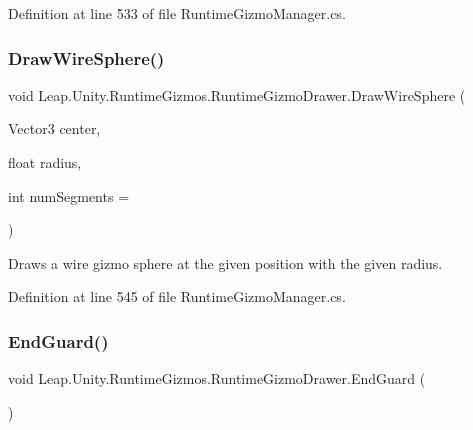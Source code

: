 Definition at line 533 of file Runtime\+Gizmo\+Manager.\+cs.

\mbox{\label{class_leap_1_1_unity_1_1_runtime_gizmos_1_1_runtime_gizmo_drawer_a39a6bcebf95fe56c25c228b2909fe77e}} 
\subsubsection{\texorpdfstring{DrawWireSphere()}{DrawWireSphere()}\hspace{0.1cm}{\footnotesize\ttfamily [2/2]}}
{\footnotesize\ttfamily void Leap.\+Unity.\+Runtime\+Gizmos.\+Runtime\+Gizmo\+Drawer.\+Draw\+Wire\+Sphere (\begin{DoxyParamCaption}\item[{Vector3}]{center,  }\item[{float}]{radius,  }\item[{int}]{num\+Segments = {} }\end{DoxyParamCaption})}



Draws a wire gizmo sphere at the given position with the given radius. 



Definition at line 545 of file Runtime\+Gizmo\+Manager.\+cs.

\mbox{\label{class_leap_1_1_unity_1_1_runtime_gizmos_1_1_runtime_gizmo_drawer_af48e1fd2f99c0ae9f58d0441ce35028b}} 
\subsubsection{\texorpdfstring{EndGuard()}{EndGuard()}}
{\footnotesize\ttfamily void Leap.\+Unity.\+Runtime\+Gizmos.\+Runtime\+Gizmo\+Drawer.\+End\+Guard (\begin{DoxyParamCaption}{ }\end{DoxyParamCaption})}



